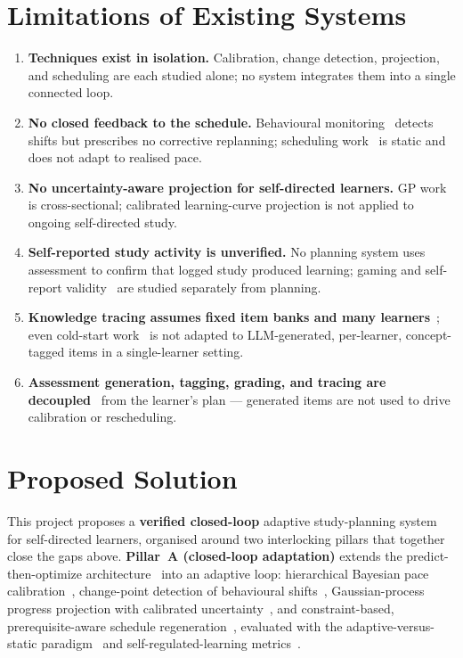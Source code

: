 \documentclass[12pt]{report}
\begin{document}
\section{Limitations of Existing Systems}

\begin{enumerate}[noitemsep]
    \item \textbf{Techniques exist in isolation.} Calibration, change detection,
    projection, and scheduling are each studied alone; no system integrates them into a
    single connected loop.
    \item \textbf{No closed feedback to the schedule.} Behavioural monitoring~\cite{saqr2026}
    detects shifts but prescribes no corrective replanning; scheduling
    work~\cite{islam2024,fabregar2025} is static and does not adapt to realised pace.
    \item \textbf{No uncertainty-aware projection for self-directed learners.} GP
    work~\cite{perezsuay2024,lin2024} is cross-sectional; calibrated learning-curve
    projection is not applied to ongoing self-directed study.
    \item \textbf{Self-reported study activity is unverified.} No planning system uses
    assessment to confirm that logged study produced learning; gaming and self-report
    validity~\cite{gaming2026,integrity2024} are studied separately from planning.
    \item \textbf{Knowledge tracing assumes fixed item banks and many
    learners}~\cite{dkvmn2024,conceptkt2026}; even cold-start
    work~\cite{clst2024,maml2026} is not adapted to LLM-generated, per-learner,
    concept-tagged items in a single-learner setting.
    \item \textbf{Assessment generation, tagging, grading, and tracing are
    decoupled}~\cite{itemgen2024,lecturequiz2026,kctag2024,concepttag2024,llmgrade2024}
    from the learner's plan --- generated items are not used to drive calibration or
    rescheduling.
\end{enumerate}

\section{Proposed Solution}

This project proposes a \textbf{verified closed-loop} adaptive study-planning system for
self-directed learners, organised around two interlocking pillars that together close the
gaps above. \textbf{Pillar~A (closed-loop adaptation)} extends the predict-then-optimize
architecture~\cite{islam2024} into an adaptive loop: hierarchical Bayesian pace
calibration~\cite{chen2024}, change-point detection of behavioural
shifts~\cite{saqr2026,qiao2026}, Gaussian-process progress projection with calibrated
uncertainty~\cite{perezsuay2024}, and constraint-based, prerequisite-aware schedule
regeneration~\cite{fabregar2025}, evaluated with the adaptive-versus-static
paradigm~\cite{pagano2026} and self-regulated-learning metrics~\cite{alhazbi2024}.
\end{document}
